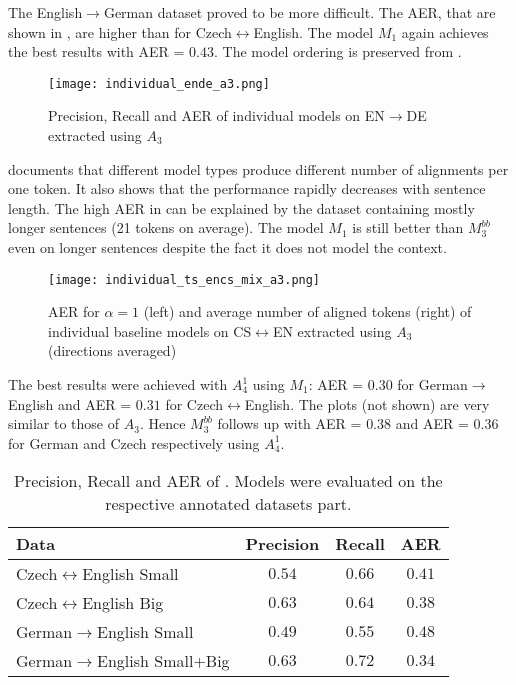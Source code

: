 The English$\rightarrow$German dataset proved to be more difficult. The AER, that are shown in , are higher than for Czech$\leftrightarrow$English. The model $M_1$ again achieves the best results with AER = $0.43$. The model ordering is preserved from .

\begin{figure*}[h!]
    \center
    \texttt{[image: individual\_ende\_a3.png]}
    \vspace*{-0.4cm}
    \caption{Precision, Recall and AER of individual models on EN$\rightarrow$DE extracted using $A_3$ \label{fig:individual_ende_a3}}
    \vspace*{0.15cm}
\end{figure*}

 documents that different model types produce different number of alignments per one token. It also shows that the performance rapidly decreases with sentence length. The high AER in  can be explained by the dataset containing mostly longer sentences (21 tokens on average). The model $M_1$ is still better than $M_3^{bb}$ even on longer sentences despite the fact it does not model the context.

\begin{figure*}[h!]
    \center
    \texttt{[image: individual\_ts\_encs\_mix\_a3.png]}
    \vspace*{-0.4cm}
    \caption{AER for $\alpha=1$ (left) and average number of aligned tokens (right) of individual baseline models on CS$\leftrightarrow$EN extracted using $A_3$ (directions averaged) \label{fig:individual_ts_encs_mix_a3}}
    \vspace*{-0.2cm}
\end{figure*}

The best results were achieved with $A_4^1$ using $M_1$: AER = $0.30$ for German$\rightarrow$English and AER = $0.31$ for Czech$\leftrightarrow$English. The plots (not shown) are very similar to those of $A_3$. Hence $M_3^{bb}$ follows up with AER = $0.38$ and AER = $0.36$ for German and Czech respectively using $A_4^1$.

\begin{table*}[h!]
    \center
    \begin{tabular}{lccc}
        \toprule
        Data & Precision & Recall & AER \\
        \midrule
        Czech$\leftrightarrow$English Small & $0.54$ & $0.66$ & $0.41$ \\
        Czech$\leftrightarrow$English Big & $0.63$ & $0.64$ & $0.38$ \\
        German$\rightarrow$English Small & $0.49$ & $0.55$ & $0.48$\\
        German$\rightarrow$English Small+Big & $0.63$ & $0.72$ & $0.34$ \\
        \bottomrule
    \end{tabular}
    \caption{Precision, Recall and AER of \fastalign{}. Models were evaluated on the respective annotated datasets part. \label{tab:individual_fastalign}}
\end{table*}

